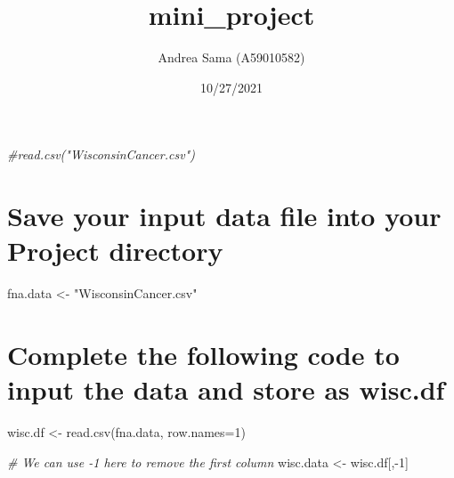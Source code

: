 \documentclass[
]{article}
\title{mini\_project}
\author{Andrea Sama (A59010582)}
\date{10/27/2021}
\newenvironment{Shaded}{\begin{snugshade}}{\end{snugshade}}
\newcommand{\AttributeTok}[1]{\textcolor[rgb]{0.77,0.63,0.00}{#1}}
\newcommand{\CommentTok}[1]{\textcolor[rgb]{0.56,0.35,0.01}{\textit{#1}}}
\newcommand{\DecValTok}[1]{\textcolor[rgb]{0.00,0.00,0.81}{#1}}
\newcommand{\FunctionTok}[1]{\textcolor[rgb]{0.00,0.00,0.00}{#1}}
\newcommand{\NormalTok}[1]{#1}
\newcommand{\OtherTok}[1]{\textcolor[rgb]{0.56,0.35,0.01}{#1}}
\newcommand{\SpecialCharTok}[1]{\textcolor[rgb]{0.00,0.00,0.00}{#1}}
\newcommand{\StringTok}[1]{\textcolor[rgb]{0.31,0.60,0.02}{#1}}
\begin{document}
\maketitle

\begin{Shaded}
\begin{Highlighting}[]
\CommentTok{\#read.csv("WisconsinCancer.csv")}
\end{Highlighting}
\end{Shaded}

\hypertarget{save-your-input-data-file-into-your-project-directory}{%
\section{Save your input data file into your Project
directory}\label{save-your-input-data-file-into-your-project-directory}}

\begin{Shaded}
\begin{Highlighting}[]
\NormalTok{fna.data }\OtherTok{\textless{}{-}} \StringTok{"WisconsinCancer.csv"}
\end{Highlighting}
\end{Shaded}

\hypertarget{complete-the-following-code-to-input-the-data-and-store-as-wisc.df}{%
\section{Complete the following code to input the data and store as
wisc.df}\label{complete-the-following-code-to-input-the-data-and-store-as-wisc.df}}

\begin{Shaded}
\begin{Highlighting}[]
\NormalTok{wisc.df }\OtherTok{\textless{}{-}} \FunctionTok{read.csv}\NormalTok{(fna.data, }\AttributeTok{row.names=}\DecValTok{1}\NormalTok{)}
\end{Highlighting}
\end{Shaded}

\begin{Shaded}
\begin{Highlighting}[]
\CommentTok{\# We can use {-}1 here to remove the first column}
\NormalTok{wisc.data }\OtherTok{\textless{}{-}}\NormalTok{ wisc.df[,}\SpecialCharTok{{-}}\DecValTok{1}\NormalTok{]}
\end{Highlighting}
\end{Shaded}

\begin{Shaded}
\end{Shaded}
\end{document}
